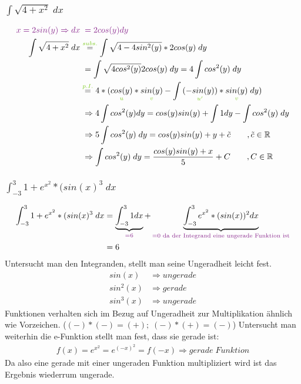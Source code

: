 \documentclass[12pt,a4paper]{article}%
\numberwithin{equation}{section}
\newcommand{\R}{\mathbb{R}} %
\def\colBord#1{\begingroup\color{Fuchsia}{#1}\endgroup}
\def\colGreen#1{\begingroup\color{LimeGreen}{#1}\endgroup}
\def\usGreen#1#2{\underset{\colGreen{#1}}{#2}}
\begin{document}
\subsubsection{$\int \sqrt{4+x^2} \; dx$}
\begin{align}
\colBord{x = 2 sin(y) \Rightarrow dx} &\;\;\colBord{=} \colBord{\;2cos(y)dy} \nonumber\\
\int \sqrt{4+x^2} \; dx &\overset{\colGreen{subs.}}{=}
\int \sqrt{4-4sin^2(y)} * 2cos(y) \; dy \nonumber\\
&\;= \int \sqrt{4cos^2(y)} 2cos(y) \; dy = 4\int cos^2(y) \; dy \nonumber\\
&\overset{\colGreen{p.I.}}{=} 4*(\usGreen{u}{cos(y)} * \usGreen{v}{sin(y)} - \int \usGreen{u'}{(-sin(y))}*\usGreen{v}{sin(y)}\;dy) \nonumber\\
&\;\Rightarrow 4\int cos^2(y) dy = cos(y)sin(y) + \int 1dy - \int cos^2(y)\; dy \nonumber\\
&\;\Rightarrow 5\int cos^2(y)\;dy = cos(y)sin(y) + y + \tilde{c} \qquad ,\tilde{c}\in\R\nonumber\\
&\;\Rightarrow \int cos^2(y)\;dy = \frac{cos(y)sin(y)+x}{5}+C \qquad, C\in\R
\end{align}

\subsubsection{$\int_{-3}^3 1+e^{x^2} *(sin(x)^3\;dx$}
\begin{align}
\int_{-3}^3 1+e^{x^2} *(sin(x)^3\;dx &= \underbrace{\int_{-3}^3 1 dx}_{\colBord{= 6}} 
+ \underbrace{\int_{-3}^{3} e^{x^2} * (sin(x))^2 dx}_{\colBord{ = 0 \text{ da der Integrand 
eine ungerade Funktion ist}}} \nonumber\\
&= 6
\end{align}
Untersucht man den Integranden, stellt man seine Ungeradheit leicht fest.
\begin{align*}
sin(x) &\Rightarrow ungerade \\
sin^2(x) &\Rightarrow gerade \\
sin^3(x) &\Rightarrow ungerade
\end{align*} 
Funktionen verhalten sich im Bezug auf Ungeradheit zur Multiplikation ähnlich wie Vorzeichen.
($(-)*(-) = (+);\; (-) * (+) = (-)$)
Untersucht man weiterhin die e-Funktion stellt man fest, dass sie gerade ist:
\begin{align*}
f(x) = e^{x^2} = e^{(-x)^2} = f(-x) \Rightarrow gerade \; Funktion
\end{align*}
Da also eine gerade mit einer ungeraden Funktion multipliziert wird ist das Ergebnis wiederrum ungerade.
\end{document}
